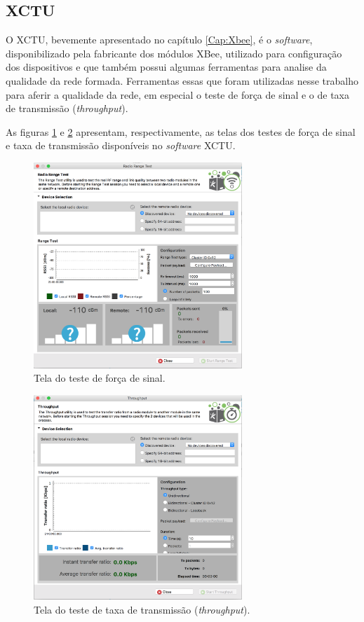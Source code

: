 \subsection{XCTU}

O XCTU, bevemente apresentado no capítulo \ref{Cap:Xbee}, é o \emph{software}, disponibilizado pela fabricante dos módulos XBee, utilizado para configuração dos dispositivos e que também possui algumas ferramentas para analise da qualidade da rede formada. Ferramentas essas que foram utilizadas nesse trabalho para aferir a qualidade da rede, em especial o teste de força de sinal e o de taxa de transmissão (\emph{throughput}).

As figuras \ref{fig:rangeTest} e \ref{fig:throughput} apresentam, respectivamente, as telas dos testes de força de sinal e taxa de transmissão disponíveis no \emph{software} XCTU.

\begin{figure}[h!] 
\center
\includegraphics[width=0.7\textwidth]{RangeTest.png}
\caption{Tela do teste de força de sinal.} 
\label{fig:rangeTest}
\end{figure}

\begin{figure}[h!] 
\center
\includegraphics[width=0.7\textwidth]{ThroughputTest.png}
\caption{Tela do teste de taxa de transmissão (\emph{throughput}).} 
\label{fig:throughput}
\end{figure}

